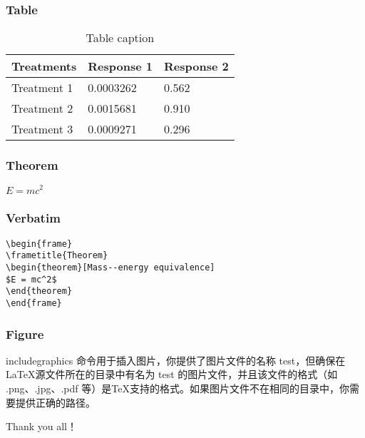\documentclass{beamer}
\begin{document}
	\begin{frame}
		\frametitle{Table}
		\begin{table}
			\begin{tabular}{l l l}
				\toprule
				\textbf{Treatments} & \textbf{Response 1} & \textbf{Response 2}\\
				\midrule
				Treatment 1 & 0.0003262 & 0.562 \\
				Treatment 2 & 0.0015681 & 0.910 \\
				Treatment 3 & 0.0009271 & 0.296 \\
				\bottomrule
			\end{tabular}
			\caption{Table caption}
		\end{table}
	\end{frame}
	
	
	\begin{frame}
		\frametitle{Theorem}
		\begin{theorem}
		\centerline{$E = mc^2$}
		\end{theorem}
	\end{frame}
	
	
	\begin{frame}[fragile] %
		\frametitle{Verbatim}
		\begin{example}
			\begin{verbatim}
\begin{frame}
\frametitle{Theorem}
\begin{theorem}[Mass--energy equivalence]
$E = mc^2$
\end{theorem}
\end{frame}\end{verbatim}
		\end{example}
	\end{frame}
	
	
	\begin{frame}
		\frametitle{Figure}
		includegraphics 命令用于插入图片，你提供了图片文件的名称 test，但确保在LaTeX源文件所在的目录中有名为 test 的图片文件，并且该文件的格式（如 .png、.jpg、.pdf 等）是TeX支持的格式。如果图片文件不在相同的目录中，你需要提供正确的路径。
	\end{frame}
	
	
	\begin{frame}
		\Huge{\centerline{Thank you all！}}
	\end{frame}
	
\end{document}

